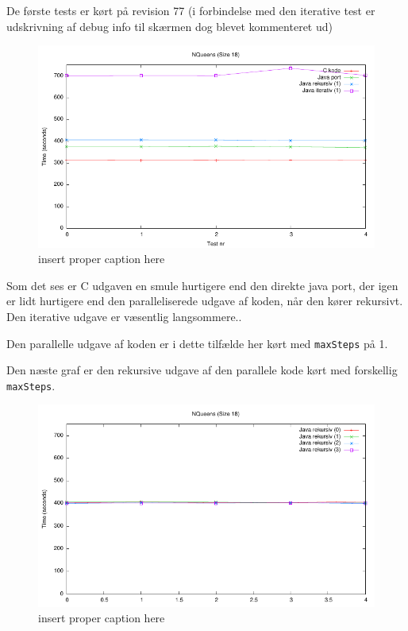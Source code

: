 De første tests er kørt på revision 77 (i forbindelse med den iterative test er
udskrivning af debug info til skærmen dog blevet kommenteret ud)

\begin{figure}
\begin{center}
\includegraphics{../benchmarks/b1.pdf}
\caption{insert proper caption here } 
\label{plot:b1}
\end{center}
\end{figure}

Som det ses er C udgaven en smule hurtigere end den direkte java port, der igen
er lidt hurtigere end den paralleliserede udgave af koden, når den kører
rekursivt. Den iterative udgave er væsentlig langsommere..

Den parallelle udgave af koden er i dette tilfælde her kørt med
\texttt{maxSteps} på 1. 

Den næste graf er den rekursive udgave af den parallele kode kørt med forskellig
\texttt{maxSteps}. 

\begin{figure}
\begin{center}
\includegraphics{../benchmarks/b2.pdf}
\caption{insert proper caption here } 
\label{plot:b2}
\end{center}
\end{figure}

